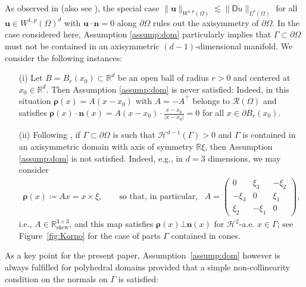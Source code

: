 \documentclass[reqno,a4paper]{amsart}
\def\tens#1{\pmb{\mathsf{#1}}}
\def\vec#1{\boldsymbol{#1}}
\def\R{\mathbb{R}}
\def\bn{\vec{n}}
\def\bu{\vec{u}}
\def\brho{\vec{\rho}}
\def\BD{\tens{D}}
\begin{document}
	\begin{example}\label{ex:failureAssump}
		As observed in \cite{DesvillettesVillani2002} (also see \cite{BP.2016,Bauer2016,Dominguez2022}), the special case $\|\bu\|_{W^{1,p}(\Omega)}\lesssim\|\BD u\|_{L^{p}(\Omega)}$ for all $\bu\in W^{1,p}(\Omega)^{d}$ with $\bu\cdot\bn=0$ along $\partial\Omega$ rules out the axisymmetry of $\partial\Omega$. In the case considered here, Assumption \ref{assump:dom} particularly implies that $\Gamma\subset\partial\Omega$ must not be contained in an axisymmetric $(d-1)$-dimensional manifold. We consider the following instances: 
		\begin{itemize}
			\item[(i)] Let $B=B_{r}(x_{0})\subset\R^{d}$ be an open ball of radius $r>0$ and centered at $x_{0}\in\R^{d}$. Then Assumption \ref{assump:dom} is never satisfied: Indeed, in this situation $\brho(x)=A(x-x_{0})$ with $A=-A^{\top}$ belongs to $\mathcal{R}(\Omega)$ and satisfies $\brho(x)\cdot\bn(x)=A(x-x_{0})\cdot \frac{x-x_{0}}{|x-x_{0}|}=0$ for all $x\in\partial B_{r}(x_{0})$. 
			\item[(ii)] Following \cite[\S 5]{DesvillettesVillani2002}, if $\Gamma\subset\partial\Omega$ is such that $\mathcal{H}^{d-1}(\Gamma)>0$ and $\Gamma$ is contained in an axisymmetric domain with axis of symmetry $\R\xi$, then Assumption \ref{assump:dom} is not satisfied. Indeed, e.g., in $d=3$ dimensions, we may consider 
			\begin{align*}
				\brho(x)\coloneqq Ax = x\times \xi,\qquad \text{so that, in particular,}\;\;\;A=\left(\begin{matrix}  0 & \xi_{3} & -\xi_{2} \\ -\xi_{3} & 0 & \xi_{1} \\ \xi_{2} & -\xi_{1} & 0 \end{matrix} \right), 
			\end{align*}
			i.e., $A\in\R_{\mathrm{skew}}^{3\times 3}$,
			and this map satisfies $\brho(x)\bot\bn(x)$ for $\mathcal{H}^{2}$-a.e. $x\in\Gamma$; 
			see Figure~\ref{fig:Korno} for the case of parts $\Gamma$ contained in cones.
		\end{itemize}
	\end{example}
	As a key point for the present	paper, Assumption~\ref{assump:dom} however is always fulfilled for polyhedral domains provided that a simple non-collinearity condition on the normals on $\Gamma$ is satisfied: 
	
\end{document}
